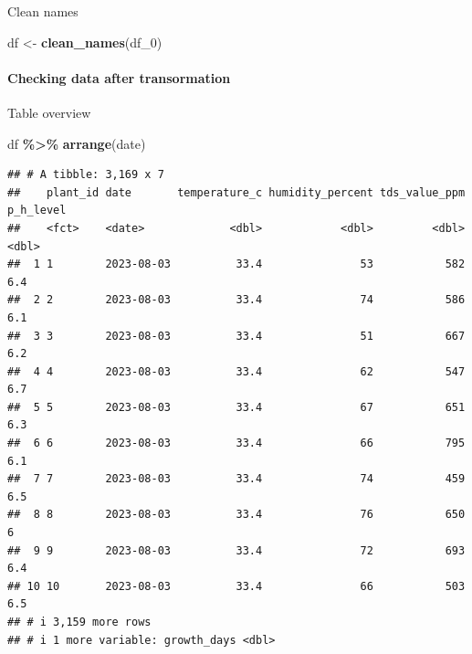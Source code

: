 \documentclass[
]{article}
\newenvironment{Shaded}{\begin{snugshade}}{\end{snugshade}}
\newcommand{\FunctionTok}[1]{\textcolor[rgb]{0.13,0.29,0.53}{\textbf{#1}}}
\newcommand{\NormalTok}[1]{#1}
\newcommand{\OtherTok}[1]{\textcolor[rgb]{0.56,0.35,0.01}{#1}}
\newcommand{\SpecialCharTok}[1]{\textcolor[rgb]{0.81,0.36,0.00}{\textbf{#1}}}
\begin{document}
\begin{Shaded}
\end{Shaded}

Clean names

\begin{Shaded}
\begin{Highlighting}[]
\NormalTok{df }\OtherTok{\textless{}{-}} \FunctionTok{clean\_names}\NormalTok{(df\_0)}
\end{Highlighting}
\end{Shaded}

\paragraph{Checking data after
transormation}\label{checking-data-after-transormation}

Table overview

\begin{Shaded}
\begin{Highlighting}[]
\NormalTok{df }\SpecialCharTok{\%\textgreater{}\%} \FunctionTok{arrange}\NormalTok{(date)}
\end{Highlighting}
\end{Shaded}

\begin{verbatim}
## # A tibble: 3,169 x 7
##    plant_id date       temperature_c humidity_percent tds_value_ppm p_h_level
##    <fct>    <date>             <dbl>            <dbl>         <dbl>     <dbl>
##  1 1        2023-08-03          33.4               53           582       6.4
##  2 2        2023-08-03          33.4               74           586       6.1
##  3 3        2023-08-03          33.4               51           667       6.2
##  4 4        2023-08-03          33.4               62           547       6.7
##  5 5        2023-08-03          33.4               67           651       6.3
##  6 6        2023-08-03          33.4               66           795       6.1
##  7 7        2023-08-03          33.4               74           459       6.5
##  8 8        2023-08-03          33.4               76           650       6  
##  9 9        2023-08-03          33.4               72           693       6.4
## 10 10       2023-08-03          33.4               66           503       6.5
## # i 3,159 more rows
## # i 1 more variable: growth_days <dbl>
\end{verbatim}
\end{document}
